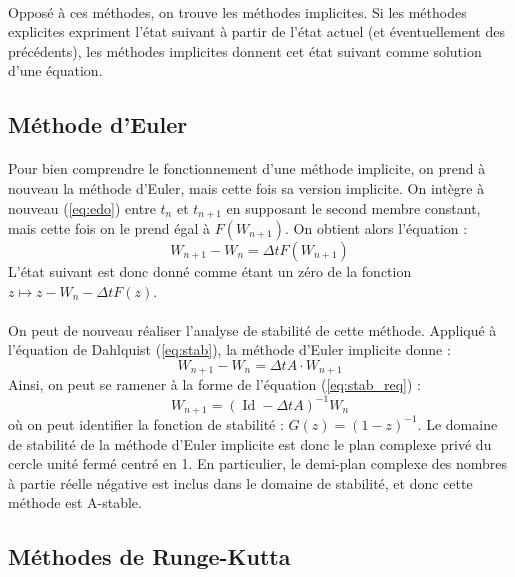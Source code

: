   \paragraph{}
  Opposé à ces méthodes, on trouve les méthodes implicites.
  Si les méthodes explicites expriment l'état suivant à partir de l'état actuel (et éventuellement des précédents), les méthodes implicites donnent cet état suivant comme solution d'une équation.

  \subsection{Méthode d'Euler}

    \paragraph{}
    Pour bien comprendre le fonctionnement d'une méthode implicite, on prend à nouveau la méthode d'Euler, mais cette fois sa version implicite.
    On intègre à nouveau (\ref{eq:edo}) entre $t_n$ et $t_{n+1}$ en supposant le second membre constant, mais cette fois on le prend égal à $F\left(W_{n+1}\right)$.
    On obtient alors l'équation :
    \[W_{n+1} - W_n = \Delta tF\left(W_{n+1}\right)\]
    L'état suivant est donc donné comme étant un zéro de la fonction $z\mapsto z - W_n - \Delta tF\left(z\right)$.

    \paragraph{}
    On peut de nouveau réaliser l'analyse de stabilité de cette méthode.
    Appliqué à l'équation de Dahlquist (\ref{eq:stab}), la méthode d'Euler implicite donne :
    \[W_{n+1} - W_n = \Delta tA\cdot W_{n+1}\]
    Ainsi, on peut se ramener à la forme de l'équation (\ref{eq:stab_req}) :
    \[W_{n+1} = \left(\operatorname{Id} - \Delta tA\right)^{-1}W_n\]
    où on peut identifier la fonction de stabilité : $G\left(z\right) = \left(1-z\right)^{-1}$.
    Le domaine de stabilité de la méthode d'Euler implicite est donc le plan complexe privé du cercle unité fermé centré en 1.
    En particulier, le demi-plan complexe des nombres à partie réelle négative est inclus dans le domaine de stabilité, et donc cette méthode est A-stable.


  \subsection{Méthodes de Runge-Kutta}

